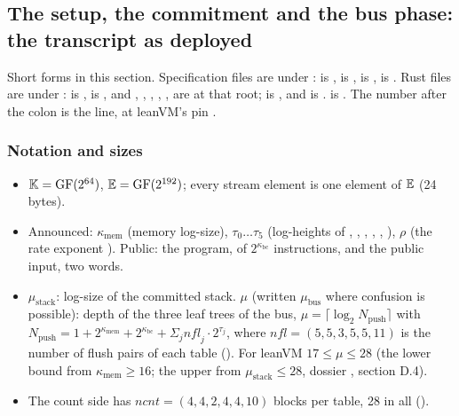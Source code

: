 \subsection{The setup, the commitment and the bus phase: the transcript as deployed}\label{sec:gen-bus-transcript}

\begin{sloppypar}
Short forms in this section. Specification files are under :
 is ,  is ,
 is ,  is .
Rust files are under :  is ,
 is , and , , ,
, ,  are at that root;  is
, and  is .
 is . The number after the colon is the line, at
leanVM's pin .
\end{sloppypar}

\subsubsection{Notation and sizes}\label{sec:gen-bus-notation}

\begin{itemize}
\item $\mathbb{K} = \mathrm{GF}(2^{64})$, $\mathbb{E} = \mathrm{GF}(2^{192})$; every stream element is one element
  of $\mathbb{E}$ (24 bytes).
\item Announced: $κ_{\mathrm{mem}}$ (memory log-size), $τ_0 … τ_5$ (log-heights of ,
  , , , , ), $ρ$ (the rate exponent
  ). Public: the program, of $2^{κ_{\mathrm{bc}}}$ instructions, and the public
  input, two words.
\item $μ_{\mathrm{stack}}$: log-size of the committed stack. $μ$ (written $μ_{\mathrm{bus}}$ where
  confusion is possible): depth of the three leaf trees of the bus,
  $μ = ⌈\log_2 N_{\mathrm{push}}⌉$ with
  $N_{\mathrm{push}} = 1 + 2^{κ_{\mathrm{mem}}} + 2^{κ_{\mathrm{bc}}} + Σ_j \mathit{nfl}_j · 2^{τ_j}$,
  where $\mathit{nfl} = (5, 5, 3, 5, 5, 11)$ is the number of flush pairs of each table
  (). For leanVM $17 ≤ μ ≤ 28$ (the
  lower bound from $κ_{\mathrm{mem}} ≥ 16$; the upper from $μ_{\mathrm{stack}} ≤ 28$, dossier
  , section D.4).
\item The count side has $\mathit{ncnt} = (4, 4, 2, 4, 4, 10)$ blocks per table, 28 in all
  ().
\end{itemize}

